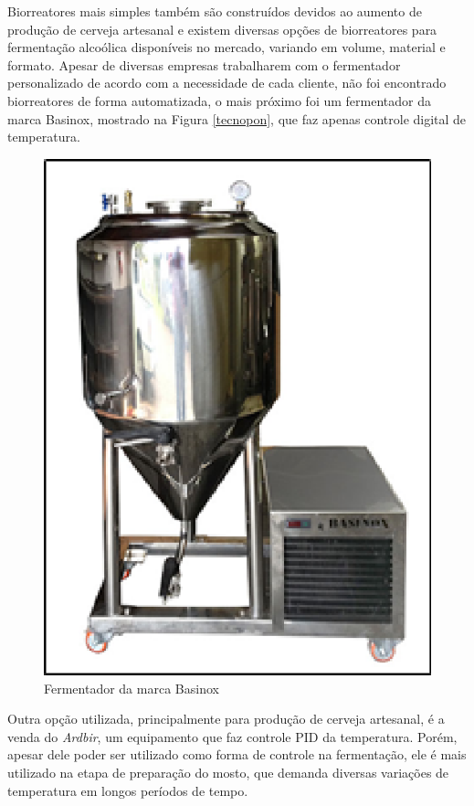 Biorreatores mais simples também são construídos devidos ao aumento de produção de cerveja artesanal e existem diversas opções de biorreatores para fermentação alcoólica disponíveis no mercado, variando em volume, material e formato. Apesar de diversas empresas trabalharem com o fermentador personalizado de acordo com a necessidade de cada cliente, não foi encontrado biorreatores de forma automatizada, o mais próximo foi um fermentador da marca Basinox, mostrado na Figura \ref{tecnopon}, que faz apenas controle digital de temperatura.

\begin{figure}[h]
	\centering
	\includegraphics[keepaspectratio=true,scale=0.8]{figuras/basinox.eps}
	\caption{Fermentador da marca Basinox}
	\label{basinox}
\end{figure}

Outra opção utilizada, principalmente para produção de cerveja
artesanal, é a venda do \textit{Ardbir}, um equipamento que faz controle PID da
temperatura. Porém, apesar dele poder ser utilizado como forma de controle na
fermentação, ele é mais utilizado na etapa de preparação do mosto, que demanda
diversas variações de temperatura em longos períodos de tempo.

